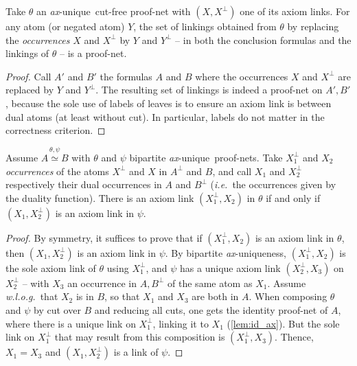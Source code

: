 \documentclass{lmcs}
\newcommand*{\orth}{^\perp} %
\newcommand*{\ie}{\emph{i.e.}}
\newcommand*{\wolog}{\emph{w.l.o.g.}}
\newcommand*{\iso}{\mathrel{\simeq}} %
\newcommand{\isoproofs}[4]{\overset{\ensuremath{#3,#4}}{#1\iso #2}}
\newcommand*{\unique}{\textit{ax}-unique}
\begin{document}
\begin{lem}
\label{lem:pn_renamed_is_pn}
Take $\theta$ an \unique\ cut-free proof-net with $(X, X\orth)$ one of its axiom links.
For any atom (or negated atom) $Y$, the set of linkings obtained from $\theta$ by replacing the \emph{occurrences} $X$ and $X\orth$ by $Y$ and $Y\orth$ -- in both the conclusion formulas and the linkings of $\theta$ -- is a proof-net.
\end{lem}
\begin{proof}
Call $A'$ and $B'$ the formulas $A$ and $B$ where the occurrences $X$ and $X\orth$ are replaced by $Y$ and $Y\orth$.
The resulting set of linkings is indeed a proof-net on $A',B'$, because the sole use of labels of leaves is to ensure an axiom link is between dual atoms (at least without cut).
In particular, labels do not matter in the correctness criterion.
\end{proof}

\begin{lem}
\label{lem:pn_iso_bij}
Assume $\isoproofs{A}{B}{\theta}{\psi}$ with $\theta$ and $\psi$ bipartite \unique\ proof-nets.
Take $X_1\orth$ and $X_2$ \emph{occurrences} of the atoms $X\orth$ and $X$ in $A\orth$ and $B$, and call $X_1$ and $X_2\orth$ respectively their dual occurrences in $A$ and $B\orth$ (\ie\ the occurrences given by the duality function).
There is an axiom link $(X_1\orth, X_2)$ in $\theta$ if and only if $(X_1, X_2\orth)$ is an axiom link in $\psi$.
\end{lem}
\begin{proof}
By symmetry, it suffices to prove that if $(X_1\orth, X_2)$ is an axiom link in $\theta$, then $(X_1, X_2\orth)$ is an axiom link in $\psi$.
By bipartite \unique ness, $(X_1\orth, X_2)$ is the sole axiom link of $\theta$ using $X_1\orth$, and $\psi$ has a unique axiom link $(X_2\orth, X_3)$ on $X_2\orth$ -- with $X_3$ an occurrence in $A, B\orth$ of the same atom as $X_1$.
Assume \wolog\ that $X_2$ is in $B$, so that $X_1$ and $X_3$ are both in $A$.
When composing $\theta$ and $\psi$ by cut over $B$ and reducing all cuts, one gets the identity proof-net of $A$, where there is a unique link on $X_1\orth$, linking it to $X_1$ (\autoref{lem:id_ax}).
But the sole link on $X_1\orth$ that may result from this composition is $(X_1\orth, X_3)$.
Thence, $X_1 = X_3$ and $(X_1, X_2\orth)$ is a link of $\psi$.
\end{proof}
\end{document}
